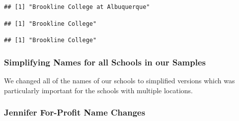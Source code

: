 \documentclass[
]{article}
\newenvironment{Shaded}{\begin{snugshade}}{\end{snugshade}}
\newcommand{\DecValTok}[1]{\textcolor[rgb]{0.00,0.00,0.81}{#1}}
\newcommand{\KeywordTok}[1]{\textcolor[rgb]{0.13,0.29,0.53}{\textbf{#1}}}
\newcommand{\NormalTok}[1]{#1}
\newcommand{\OperatorTok}[1]{\textcolor[rgb]{0.81,0.36,0.00}{\textbf{#1}}}
\newcommand{\StringTok}[1]{\textcolor[rgb]{0.31,0.60,0.02}{#1}}
\begin{document}
\begin{verbatim}
## [1] "Brookline College at Albuquerque"
\end{verbatim}

\begin{Shaded}
\end{Shaded}

\begin{Shaded}
\end{Shaded}

\begin{verbatim}
## [1] "Brookline College"
\end{verbatim}

\begin{Shaded}
\end{Shaded}

\begin{verbatim}
## [1] "Brookline College"
\end{verbatim}

\hypertarget{simplifying-names-for-all-schools-in-our-samples}{%
\subsubsection{Simplifying Names for all Schools in our
Samples}\label{simplifying-names-for-all-schools-in-our-samples}}

We changed all of the names of our schools to simplified versions which
was particularly important for the schools with multiple locations.

\hypertarget{jennifer-for-profit-name-changes}{%
\subsubsection{Jennifer For-Profit Name
Changes}\label{jennifer-for-profit-name-changes}}
\end{document}
